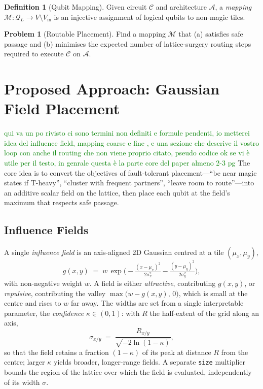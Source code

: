 \documentclass[10pt,conference]{IEEEtran}
\theoremstyle{definition}
\newtheorem{definition}{Definition}
\newtheorem{problem}{Problem}
\theoremstyle{remark}
\newcommand{\A}{\mathcal{A}}            %
\newcommand{\C}{\mathcal{C}}            %
\newcommand{\Q}{\mathcal{Q}}            %
\newcommand{\M}{\mathcal{M}}            %
\begin{document}
\begin{definition}[Qubit Mapping]
    Given circuit $\C$ and architecture $\A$, a \emph{mapping}
    $\M : \Q_L \to V\setminus V_{\mathrm m}$ is an injective assignment of
    logical qubits to non-magic tiles.
\end{definition}

\begin{problem}[Routable Placement]
    Find a mapping $\M$ that (a) satisfies safe passage and (b) minimises the
    expected number of lattice-surgery routing steps required to execute $\C$
    on $\A$.
\end{problem}

\section{Proposed Approach: Gaussian Field Placement}
\label{sec:approach}
\textcolor{green}{qui va un po rivisto ci sono termini non definiti e formule pendenti, io metterei idea del influence field, mapping coarse e fine , e una sezione che descrive  il vostro loop con anche il routing che non viene proprio citato, pseudo codice ok se vi è utile per il testo, in genrale questa è la parte core del paper almeno 2-3 pg}
The core idea is to convert the objectives of fault-tolerant
placement---``be near magic states if T-heavy'', ``cluster with frequent
partners'', ``leave room to route''---into an additive scalar field on the
lattice, then place each qubit at the field's maximum that respects safe passage.

\subsection{Influence Fields}
\label{sec:fields}

A single \emph{influence field} is an axis-aligned 2D Gaussian centred at a tile
$(\mu_x,\mu_y)$,
\begin{equation}
g(x,y) \;=\; w\,\exp\!\Big(\!-\tfrac{(x-\mu_x)^2}{2\sigma_x^2}
                              -\tfrac{(y-\mu_y)^2}{2\sigma_y^2}\Big),
\label{eq:gauss}
\end{equation}
with non-negative weight $w$. A field is either \emph{attractive}, contributing
$g(x,y)$, or \emph{repulsive}, contributing the valley
$\max\!\big(w-g(x,y),\,0\big)$, which is small at the centre and rises to $w$
far away. The widths are set from a single interpretable parameter, the
\emph{confidence} $\kappa\in(0,1)$: with $R$ the half-extent of the grid along
an axis,
\begin{equation}
\sigma_{x/y} \;=\; \frac{R_{x/y}}{\sqrt{-2\ln(1-\kappa)}},
\label{eq:sigma}
\end{equation}
so that the field retains a fraction $(1-\kappa)$ of its peak at distance $R$
from the centre; larger $\kappa$ yields broader, longer-range fields. 
A separate \texttt{size} multiplier bounds the region of the lattice over which
the field is evaluated, independently of its width $\sigma$.
\end{document}
